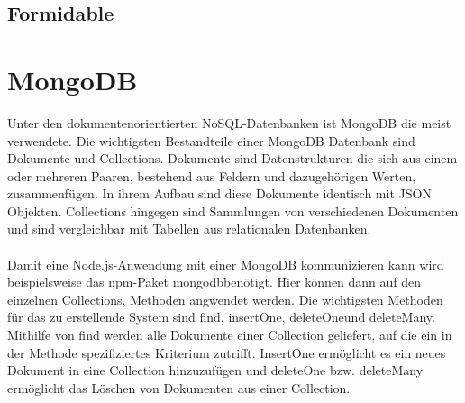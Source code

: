 \subsection{Formidable}

\section{MongoDB}
Unter den dokumentenorientierten NoSQL-Datenbanken ist MongoDB die meist verwendete. Die wichtigsten Bestandteile einer MongoDB Datenbank sind Dokumente und Collections. Dokumente sind Datenstrukturen die sich aus einem oder mehreren Paaren, bestehend aus Feldern und dazugehörigen Werten, zusammenfügen. In ihrem Aufbau sind diese Dokumente identisch mit JSON Objekten. Collections hingegen sind Sammlungen von verschiedenen Dokumenten und sind vergleichbar mit Tabellen aus relationalen Datenbanken.
\\
\\
Damit eine Node.js-Anwendung mit einer MongoDB kommunizieren kann wird beispielsweise das \glqq npm\grqq-Paket \glqq mongodb\grqq benötigt. Hier können dann auf den einzelnen Collections, Methoden angwendet werden. Die wichtigsten Methoden für das zu erstellende System sind \glqq find\grqq , \glqq insertOne\grqq , \glqq deleteOne\grqq und \glqq deleteMany\grqq. Mithilfe von find werden alle Dokumente einer Collection geliefert, auf die ein in der Methode spezifiziertes Kriterium zutrifft. InsertOne ermöglicht es ein neues Dokument in eine Collection hinzuzufügen und deleteOne bzw. deleteMany ermöglicht das Löschen von Dokumenten aus einer Collection.
